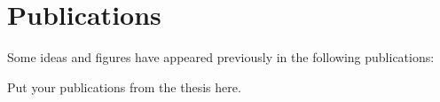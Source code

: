 \chapter*{Publications}
Some ideas and figures have appeared previously in the following publications:

\bigskip

\noindent Put your publications from the thesis here.
